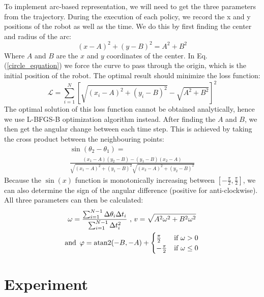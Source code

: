 \documentclass[journal]{IEEEtran}
\begin{document}
To implement arc-based representation, we will need to get the three parameters from the trajectory. 
During the execution of each policy, we record the x and y positions of the robot as well as the time.
We do this by first finding the center and radius of the arc:
\begin{equation}
(x - A)^2 + (y - B)^2 = A^2 + B^2
\label{circle_equation}
\end{equation}
Where $A$ and $B$ are the $x$ and $y$ coordinates of the center. In Eq. (\ref{circle_equation}) we force the curve to pass through the origin, which is the initial position of the robot.
The optimal result should minimize the loss function: 
\begin{equation}
\mathcal{L} = 
\sum_{i=1}^N \left[
\sqrt{(x_i - A)^2 + (y_i - B)^2} - \sqrt{A^2 + B^2}
\right]^2
\label{circle_error}
\end{equation}
The optimal solution of this loss function cannot be obtained analytically, hence we use L-BFGS-B \cite{L-BFGS-B} optimization algorithm instead.
After finding the $A$ and $B$, we then get the angular change between each time step.
This is achieved by taking the cross product between the neighbouring points:
\begin{equation}
\begin{gathered}
\sin(\theta_2 - \theta_1) = \\
\frac{(x_1 - A)(y_2 - B)-(y_1 - B)(x_2 - A)}{
\sqrt{(x_1 - A)^2 + (y_1 - B)^2} \sqrt{(x_2 - A)^2 + (y_2 - B)^2}
}
\end{gathered}
\label{delta_theta}
\end{equation}
Because the $\sin (x)$ function is monotonically increasing between $[-\frac{\pi}{2}, \frac{\pi}{2}]$, we can also determine the sign of the angular difference (positive for anti-clockwise).
All three parameters can then be calculated:
\begin{equation}
\begin{gathered}
\omega = \frac{
\sum_{i=1}^{N-1} \Delta \theta_i \Delta t_i}{
\sum_{i=1}^{N-1} \Delta t_i^2}
\text{ , }
v = \sqrt{A^2 \omega^2 + B^2 \omega^2}
\\
\text{and \,}
\varphi = \operatorname{atan2}(-B, -A) + 
\begin{cases} 
\frac{\pi}{2} & \text{if } \omega > 0 \\
-\frac{\pi}{2} & \text{if } \omega \leq 0 
\end{cases}
\end{gathered}
\label{w_and_v}
\end{equation}




\section{Experiment}







\end{document}
